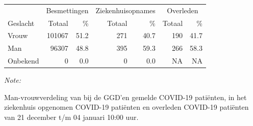 \documentclass[
  english,
  man,floatsintext]{apa6}
\begin{document}
\begin{table}
\centering\begingroup\fontsize{11}{13}\selectfont

\begin{threeparttable}
\begin{tabular}{lrrrrrr}
\toprule
\multicolumn{1}{c}{ } & \multicolumn{2}{c}{Besmettingen} & \multicolumn{2}{c}{Ziekenhuisopnames} & \multicolumn{2}{c}{Overleden} \\
\cmidrule(l{3pt}r{3pt}){2-3} \cmidrule(l{3pt}r{3pt}){4-5} \cmidrule(l{3pt}r{3pt}){6-7}
Geslacht & Totaal & \% & Totaal & \% & Totaal & \%\\
\midrule
Vrouw & 101067 & 51.2 & 271 & 40.7 & 190 & 41.7\\
Man & 96307 & 48.8 & 395 & 59.3 & 266 & 58.3\\
Onbekend & 0 & 0.0 & 0 & 0.0 & NA & NA\\
\bottomrule
\end{tabular}
\begin{tablenotes}
\item \textit{Note: } 
\item Man-vrouwverdeling van bij de GGD’en gemelde COVID-19 patiënten, in het ziekenhuis opgenomen COVID-19 patiënten en overleden COVID-19 patiënten van 21 december t/m 04 januari 10:00 uur.
\end{tablenotes}
\end{threeparttable}
\endgroup{}
\end{table}
\newpage
\end{document}
